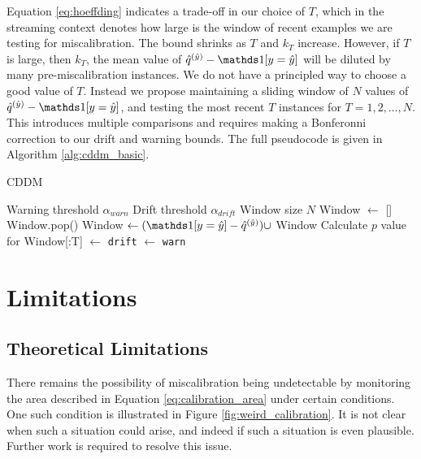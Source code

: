 Equation \ref{eq:hoeffding} indicates a trade-off in our choice of $T$, which in the streaming context denotes how large is the window of recent examples we are testing for miscalibration. The bound shrinks as $T$ and $k_T$ increase. However, if $T$ is large, then $k_T$, the mean value of $\qhatyhat-\id{y=\hat{y}}$ will be diluted by many pre-miscalibration instances. We do not have a principled way to choose a good value of $T$. Instead we propose maintaining a sliding window of $N$ values of $\qhatyhat-\id{y=\hat{y}}$, and testing the most recent $T$ instances for $T=1,2,\dots,N$. This introduces multiple comparisons and requires making a Bonferonni correction to our drift and warning bounds. The full pseudocode is given in Algorithm \ref{alg:cddm_basic}.

\begin{algorithm}
    \caption{CDDM}
    \label{alg:cddm_basic}
    \begin{algorithmic}
        \Require Warning threshold $\alpha_{warn}$
        \Require Drift threshold $\alpha_{drift}$
        \Require Window size $N$
        \State Window $\gets$ []
            \State Window.pop()
	    \State Window $\gets (\id{y=\hat{y}} - \qhatyhat) \cup$ Window
                \State Calculate $p$ value for Window[:T]
                     $\gets$ {\tt drift}
                     $\gets$ {\tt warn}
                \EndIf
            \EndFor
        \EndFor
    \end{algorithmic}
\end{algorithm}


\section{Limitations} \label{CDDM:limitations}

\subsection{Theoretical Limitations}

There remains the possibility of miscalibration being undetectable by monitoring the area described in Equation \ref{eq:calibration_area} under certain conditions. One such condition is illustrated in Figure \ref{fig:weird_calibration}. It is not clear when such a situation could arise, and indeed if such a situation is even plausible. Further work is required to resolve this issue.

